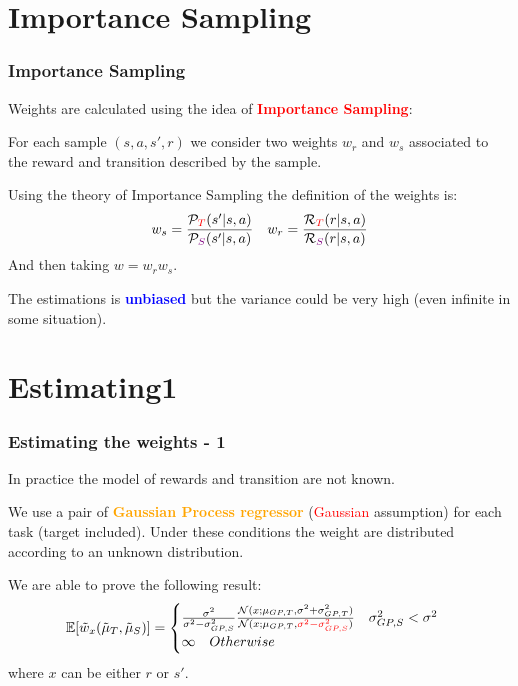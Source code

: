 \documentclass[professionalfont]{beamer}
\begin{document}
  \section{Importance Sampling}
     \begin{frame}
  	 \frametitle{Importance Sampling}
      Weights are calculated using the idea of \textcolor{red}{\textbf{Importance Sampling}}:\newline

      For each sample $(s,a,s',r)$ we consider two weights $w_r$ and $w_s$ associated
      to the reward and transition described by the sample.\newline
      \pause

      Using the theory of Importance Sampling the definition of the weights is:
      \begin{equation*}
        w_s = \frac{\mathcal{P}_{\textcolor{red}{T}}(s'|s,a)}{\mathcal{P}_{\textcolor{violet}{S}}(s'|s,a)} \quad
        w_r = \frac{\mathcal{R}_{\textcolor{red}{T}}(r|s,a)}{\mathcal{R}_{\textcolor{violet}{S}}(r|s,a)}
      \end{equation*}
      And then taking $w = w_{r}w_{s}$.\newline

      The estimations is \textcolor{blue}{\textbf{unbiased}} but the variance could be very high (even infinite in some situation).
  	\end{frame}

   \section{Estimating1}
      \begin{frame}
    	\frametitle{Estimating the weights - 1}
      In practice the model of rewards and transition are not known.\newline

      We use a pair of \textcolor{orange}{\textbf{Gaussian Process regressor}} (\textcolor{red}{Gaussian} assumption) for each task (target included).\newline
      Under these conditions the weight are distributed according to an unknown distribution.\newline
      \pause

      We are able to prove the following result:
      \begin{equation*}
        \mathbb{E}[\tilde{w}_{x}(\tilde{\mu}_{T}, \tilde{\mu}_{S})] =
        \begin{cases}
          \frac{\sigma^{2}}{\sigma^{2} - \sigma^{2}_{GP,S}} \frac{\mathcal{N}(x; \mu_{GP,T}, \sigma^{2} + \sigma^{2}_{GP,T})}{\mathcal{N}(x; \mu_{GP,T}, \textcolor{red}{\sigma^{2} - \sigma^{2}_{GP,S}})} \quad \sigma^{2}_{GP,S} < \sigma^{2} \\
          \infty \quad Otherwise
        \end{cases}
      \end{equation*}
      where $x$ can be either $r$ or $s'$.
    	\end{frame}
\end{document}

